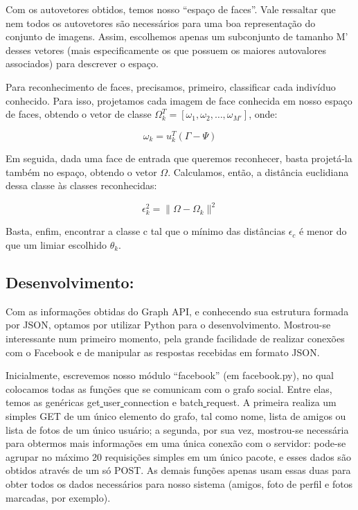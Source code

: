 \documentclass[10pt,a4paper]{article}
\begin{document}
Com os autovetores obtidos, temos nosso “espaço de faces”. Vale ressaltar que nem todos os autovetores são necessários para uma boa representação do conjunto de imagens. Assim, escolhemos apenas um subconjunto de tamanho M’ desses vetores (mais especificamente os que possuem os maiores autovalores associados) para descrever o espaço.

Para reconhecimento de faces, precisamos, primeiro, classificar cada indivíduo conhecido. Para isso, projetamos cada imagem de face conhecida em nosso espaço de faces, obtendo o vetor de classe $\Omega_k^T = [ \omega_1, \omega_2, \ldots,\omega_{M'} ]$, onde:

\begin{equation}
  \omega_k=u_k^T(\Gamma-\Psi)
\end{equation}

Em seguida, dada uma face de entrada que queremos reconhecer, basta projetá-la também no espaço, obtendo o vetor $\Omega$. Calculamos, então, a distância euclidiana dessa classe às classes reconhecidas:

\begin{equation}
  \epsilon_k^2=\|\Omega-\Omega_k\|^2
\end{equation}

Basta, enfim, encontrar a classe c tal que o mínimo das distâncias $\epsilon_c$ é menor do que um limiar escolhido $\theta_k$.

\subsection*{Desenvolvimento:}
	Com as informações obtidas do Graph API, e conhecendo sua estrutura formada por JSON, optamos por utilizar Python para o desenvolvimento. Mostrou-se interessante num primeiro momento, pela grande facilidade de realizar conexões com o Facebook e de manipular as respostas recebidas em formato JSON.

	Inicialmente, escrevemos nosso módulo “facebook” (em facebook.py), no qual colocamos todas as funções que se comunicam com o grafo social. Entre elas, temos as genéricas get\underline{ }user\underline{ }connection e batch\underline{ }request. A primeira realiza um simples GET de um único elemento do grafo, tal como nome, lista de amigos ou lista de fotos de um único usuário; a segunda, por sua vez, mostrou-se necessária para obtermos mais informações em uma única conexão com o servidor: pode-se agrupar no máximo 20 requisições simples em um único pacote, e esses dados são obtidos através de um só POST. As demais funções apenas usam essas duas para obter todos os dados necessários para nosso sistema (amigos, foto de perfil e fotos marcadas, por exemplo).
\end{document}
